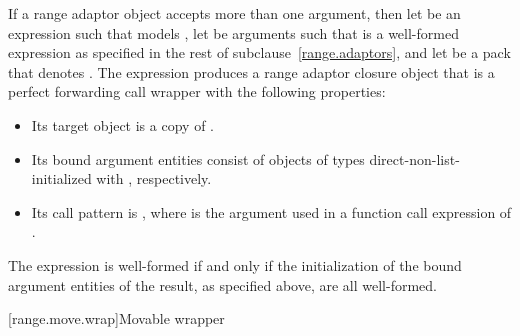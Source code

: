 \pnum
If a range adaptor object  accepts more than one argument,
then let  be an expression
such that  models ,
let  be arguments
such that  is a well-formed expression
as specified in the rest of subclause~\ref{range.adaptors}, and
let  be a pack
that denotes .
The expression  produces a range adaptor closure object 
that is a perfect forwarding call wrapper with the following properties:
\begin{itemize}
\item
Its target object is a copy of .
\item
Its bound argument entities  consist of objects of types  direct-non-list-initialized with , respectively.
\item
Its call pattern is ,
where  is the argument used in a function call expression of .
\end{itemize}
The expression  is well-formed if and only if
the initialization of the bound argument entities of the result,
as specified above, are all well-formed.

[range.move.wrap]{Movable wrapper}

